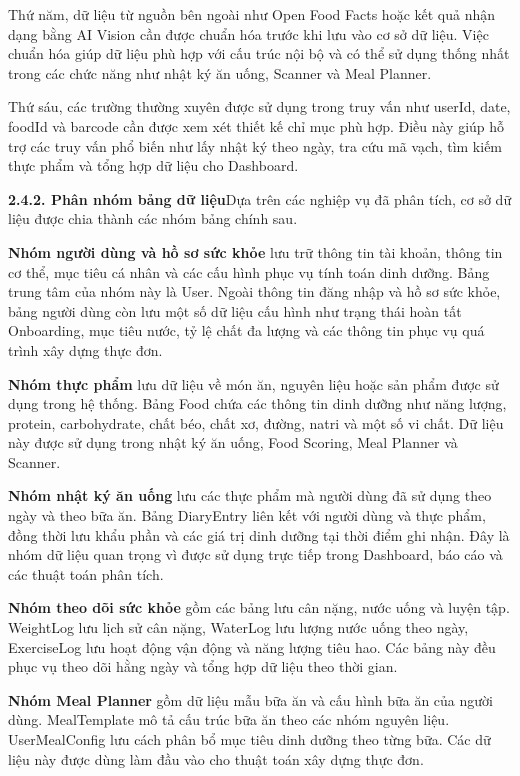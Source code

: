 Thứ năm, dữ liệu từ nguồn bên ngoài như Open Food Facts hoặc kết quả nhận dạng bằng AI Vision cần được chuẩn hóa trước khi lưu vào cơ sở dữ liệu. Việc chuẩn hóa giúp dữ liệu phù hợp với cấu trúc nội bộ và có thể sử dụng thống nhất trong các chức năng như nhật ký ăn uống, Scanner và Meal Planner.

Thứ sáu, các trường thường xuyên được sử dụng trong truy vấn như userId, date, foodId và barcode cần được xem xét thiết kế chỉ mục phù hợp. Điều này giúp hỗ trợ các truy vấn phổ biến như lấy nhật ký theo ngày, tra cứu mã vạch, tìm kiếm thực phẩm và tổng hợp dữ liệu cho Dashboard.

\textbf{2.4.2. Phân nhóm bảng dữ liệu}Dựa trên các nghiệp vụ đã phân tích, cơ sở dữ liệu được chia thành các nhóm bảng chính sau.

\textbf{Nhóm người dùng và hồ sơ sức khỏe} lưu trữ thông tin tài khoản, thông tin cơ thể, mục tiêu cá nhân và các cấu hình phục vụ tính toán dinh dưỡng. Bảng trung tâm của nhóm này là User. Ngoài thông tin đăng nhập và hồ sơ sức khỏe, bảng người dùng còn lưu một số dữ liệu cấu hình như trạng thái hoàn tất Onboarding, mục tiêu nước, tỷ lệ chất đa lượng và các thông tin phục vụ quá trình xây dựng thực đơn.

\textbf{Nhóm thực phẩm} lưu dữ liệu về món ăn, nguyên liệu hoặc sản phẩm được sử dụng trong hệ thống. Bảng Food chứa các thông tin dinh dưỡng như năng lượng, protein, carbohydrate, chất béo, chất xơ, đường, natri và một số vi chất. Dữ liệu này được sử dụng trong nhật ký ăn uống, Food Scoring, Meal Planner và Scanner.

\textbf{Nhóm nhật ký ăn uống} lưu các thực phẩm mà người dùng đã sử dụng theo ngày và theo bữa ăn. Bảng DiaryEntry liên kết với người dùng và thực phẩm, đồng thời lưu khẩu phần và các giá trị dinh dưỡng tại thời điểm ghi nhận. Đây là nhóm dữ liệu quan trọng vì được sử dụng trực tiếp trong Dashboard, báo cáo và các thuật toán phân tích.

\textbf{Nhóm theo dõi sức khỏe} gồm các bảng lưu cân nặng, nước uống và luyện tập. WeightLog lưu lịch sử cân nặng, WaterLog lưu lượng nước uống theo ngày, ExerciseLog lưu hoạt động vận động và năng lượng tiêu hao. Các bảng này đều phục vụ theo dõi hằng ngày và tổng hợp dữ liệu theo thời gian.

\textbf{Nhóm Meal Planner} gồm dữ liệu mẫu bữa ăn và cấu hình bữa ăn của người dùng. MealTemplate mô tả cấu trúc bữa ăn theo các nhóm nguyên liệu. UserMealConfig lưu cách phân bổ mục tiêu dinh dưỡng theo từng bữa. Các dữ liệu này được dùng làm đầu vào cho thuật toán xây dựng thực đơn.

